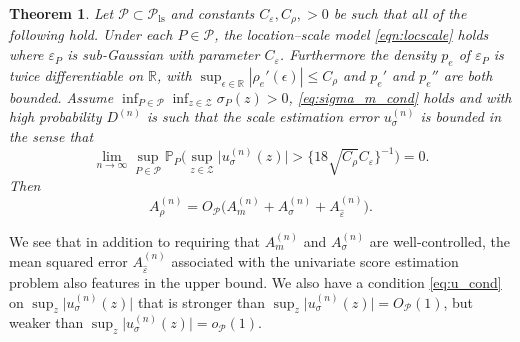 \documentclass[aos]{imsart}
\renewcommand{\Pr}{\mathbb{P}}
\newcommand{\R}{\mathbb{R}}
\newtheorem{theorem}{Theorem}
\begin{document}
	
	\begin{theorem}
		\label{thm:subgscoreestimation}
		Let $\mathcal{P}\subset\mathcal{P}_{\text{ls}}$ and constants $C_\varepsilon, C_\rho, >0$ be such that all of the following hold. Under each $P\in\mathcal{P}$, the location--scale model \eqref{eqn:locscale} holds where $\varepsilon_P$ is sub-Gaussian with parameter $C_\varepsilon$. Furthermore the density $p_{e}$ of $\varepsilon_P$ is twice differentiable on $\R$, with $\sup_{\epsilon\in\R} |\rho_{e}'(\epsilon)|\leq C_\rho$
		and $p_{e}'$ and $ p_{e}''$ are both bounded.
		Assume $\inf_{P\in\mathcal{P}} \inf_{z\in\mathcal Z} \sigma_P(z)>0$, \eqref{eq:sigma_m_cond} holds and
		with high probability $D^{(n)}$ is such that the
		scale estimation error $u_\sigma^{(n)}$ is bounded in the sense that
		\begin{equation} \label{eq:u_cond}
			\lim_{n\to\infty} \sup_{P\in\mathcal{P}} \Pr_P\Big(\sup_{z\in\mathcal Z}\big|u_\sigma^{(n)}(z)\big| >  \{18 \sqrt{C_{\rho} }C_{\varepsilon}\}^{-1} \Big) = 0.
		\end{equation}
		Then \begin{equation*}
			A_\rho^{(n)} = O_{\mathcal{P}} \big(A_m^{(n)} + A_\sigma^{(n)} + A_{\hat\varepsilon}^{(n)}\big).
		\end{equation*}
	\end{theorem}
We see that in addition to requiring that $A_m^{(n)}$ and $A_\sigma^{(n)}$ are well-controlled, the mean squared error $ A_{\hat\varepsilon}^{(n)}$ associated with the univariate  score estimation problem also features in the upper bound.
We also have a  condition \eqref{eq:u_cond} on $\sup_{z}\big|u_\sigma^{(n)}(z)\big|$ that is stronger than $\sup_{z}\big|u_\sigma^{(n)}(z)\big| = O_{\mathcal{P}}(1)$, but weaker than $\sup_{z}\big|u_\sigma^{(n)}(z) \big| = o_{\mathcal{P}}(1)$.
\end{document}
